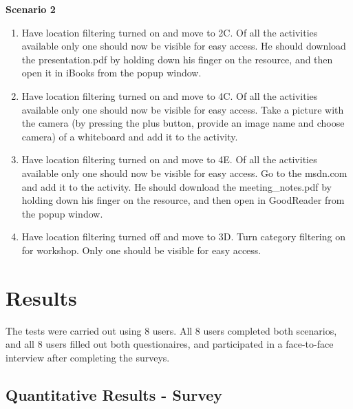 \textbf{Scenario 2}

\begin{enumerate}
\item Have location filtering turned on and move to 2C. Of all the activities available only one should now be visible for easy access. He should download the presentation.pdf by holding down his finger on the resource, and then open it in iBooks from the popup window.
\item Have location filtering turned on and move to 4C. Of all the activities available only one should now be visible for easy access. Take a picture with the camera (by pressing the plus button, provide an image name and choose camera) of a whiteboard and add it to the activity.
\item Have location filtering turned on and move to 4E. Of all the activities available only one should now be visible for easy access. Go to the msdn.com and add it to the activity. He should download the meeting\_notes.pdf by holding down his finger on the resource, and then open in GoodReader from the popup window.
\item Have location filtering turned off and move to 3D. Turn category filtering on for workshop. Only one should be visible for easy access.
\end{enumerate}

\section{Results}
The tests were carried out using 8 users. All 8 users completed both scenarios, and all 8 users filled out both questionaires, and participated in a face-to-face interview after completing the surveys.

\subsection{Quantitative Results - Survey}

